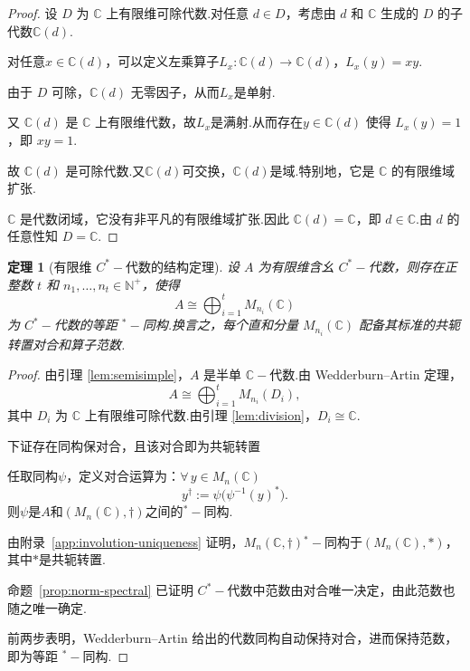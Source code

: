 \documentclass{ctexart}
\newtheorem{theorem}{定理}[section]
\theoremstyle{plain}
\newtheorem*{proof}{证明}
\theoremstyle{plain}
\begin{document}
\begin{proof}
    设 $D$ 为 $\mathbb{C}$ 上有限维可除代数.对任意 $d \in D$，考虑由 $d$ 和 $\mathbb{C}$ 生成的 $D$ 的子代数$\mathbb{C}(d)$.\par
    对任意$x\in \mathbb{C}(d)$，可以定义左乘算子$L_x:\mathbb{C}(d) \to \mathbb{C}(d)$，$L_x(y) = xy$.\par
    由于 $D$ 可除，$\mathbb{C}(d)$ 无零因子，从而$L_x$是单射.\par
    又 $\mathbb{C}(d)$ 是 $\mathbb{C}$ 上有限维代数，故$L_x$是满射.从而存在$y\in\mathbb{C}(d)$ 使得 $L_x(y) = 1$，即 $xy = 1$.\par
    故 $\mathbb{C}(d)$ 是可除代数.又$\mathbb{C}(d)$可交换，$\mathbb{C}(d)$是域.特别地，它是 $\mathbb{C}$ 的有限维域扩张.\par
    $\mathbb{C}$ 是代数闭域，它没有非平凡的有限维域扩张.因此 $\mathbb{C}(d) = \mathbb{C}$，即 $d \in \mathbb{C}$.由 $d$ 的任意性知 $D = \mathbb{C}$.
\end{proof}



\begin{theorem}[有限维 $C^*-\!$代数的结构定理]\label{thm:fd-cstar}
    设 $A$ 为有限维含幺 $C^*-\!$代数，则存在正整数 $t$ 和 $n_1, \dots, n_t \in \mathbb{N}^+$，使得
    \begin{equation}\label{eq:fd-cstar-classification}
        A \cong \bigoplus_{i=1}^t M_{n_i}(\mathbb{C})
    \end{equation}
    为 $C^*-\!$代数的等距 ${}^*-\!$同构.换言之，每个直和分量 $M_{n_i}(\mathbb{C})$ 配备其标准的共轭转置对合和算子范数.
\end{theorem}

\begin{proof}
    由引理 \ref{lem:semisimple}，$A$ 是半单 $\mathbb{C}-\!$代数.由 Wedderburn--Artin 定理，
    \begin{equation}
        A \cong \bigoplus_{i=1}^t M_{n_i}(D_i),
    \end{equation}
    其中 $D_i$ 为 $\mathbb{C}$ 上有限维可除代数.由引理 \ref{lem:division}，$D_i \cong \mathbb{C}$.\par
    下证存在同构保对合，且该对合即为共轭转置\par
    任取同构$\psi$，定义对合运算为：$\forall\, y\in M_n(\mathbb{C})$
    \begin{equation*}
        y^\dag := \psi\bigl(\psi^{-1}(y)^*\bigr).
    \end{equation*}
    则$\psi$是$A$和$(M_n(\mathbb{C}),\dag)$之间的${}^*-\!$同构.\par
    由附录~\ref{app:involution-uniqueness} 证明，$M_n(\mathbb{C},\dag)$${}^*-\!$同构于$(M_n(\mathbb{C}), *)$，其中$*$是共轭转置.\par
    命题~\ref{prop:norm-spectral} 已证明 $C^*-\!$代数中范数由对合唯一决定，由此范数也随之唯一确定.\par
    前两步表明，Wedderburn--Artin 给出的代数同构自动保持对合，进而保持范数，即为等距 ${}^*-\!$同构.
\end{proof}
\end{document}

